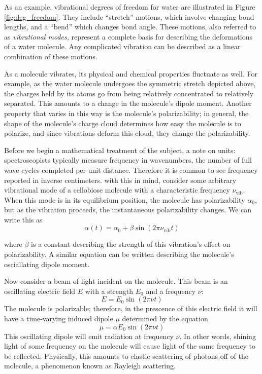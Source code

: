 As an example, vibrational degrees of freedom for water are illustrated in Figure \ref{fig:deg_freedom}. They include ``stretch'' motions, which involve changing bond lengths, and a ``bend'' which changes bond angle. These motions, also referred to as \emph{vibrational modes,} represent a complete basis for describing the deformations of a water molecule. Any complicated vibration can be described as a linear combination of these motions.

As a molecule vibrates, its physical and chemical properties fluctuate as well. For example, as the water molecule undergoes the symmetric stretch depicted above, the charges held by its atoms go from being relatively concentrated to relatively separated. This amounts to a change in the molecule's dipole moment. Another property that varies in this way is the molecule's polarizability; in general, the shape of the molecule's charge cloud determines how easy the molecule is to polarize, and since vibrations deform this cloud, they change the polarizability.

Before we begin a mathematical treatment of the subject, a note on units: spectroscopists typically measure frequency in wavenumbers, the number of full wave cycles completed per unit distance. Therefore it is common to see frequency reported in inverse centimeters. with this in mind, consider some arbitrary vibrational mode of a cellobiose molecule with a characteristic frequency $\nu_{\mathrm{vib}}$. When this mode is in its equilibrium position, the molecule has polarizability $\alpha_0$, but as the vibration proceeds, the instantaneous polarizability changes. We can write this as
\begin{equation}
\alpha (t) = \alpha_0 + \beta\sin(2\pi\nu_\mathrm{vib} t)
\end{equation}

where $\beta$ is a constant describing the strength of this vibration's effect on polarizability. A similar equation can be written describing the molecule's osciallating dipole moment.

Now consider a beam of light incident on the molecule. This beam is an oscillating electric field $E$ with a strength $E_0$ and a frequency $\nu$:
\begin{equation}
E = E_0\sin(2\pi\nu t)
\end{equation}
The molecule is polarizable; therefore, in the prescence of this electric field it will have a time-varying induced dipole $\mu$ determined by the equation
\begin{equation}
\label{eq:simple_dipole}
\mu = \alpha E_0\sin(2\pi\nu t)
\end{equation}
This oscillating dipole will emit radiation at frequency $\nu$. In other words, shining light of some frequency on the molecule will cause light of the same frequency to be reflected. Physically, this amounts to elastic scattering of photons off of the molecule, a phenomenon known as Rayleigh scattering.

